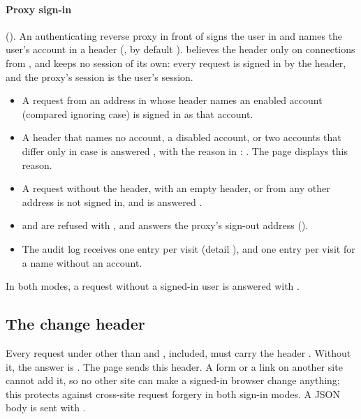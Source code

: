 \paragraph{Proxy sign-in} (). An authenticating reverse proxy in front
of \md{} signs the user in and names the user's account in a header (,
by default ). \md{} believes the header only on connections from
, and keeps no session of its own: every request is signed in by the
header, and the proxy's session is the user's session.
\begin{itemize}
\item A request from an address in  whose header names an enabled account
  (compared ignoring case) is signed in as that account.
\item A header that names no account, a disabled account, or two accounts that differ only in
  case is answered , with the reason in : . The page
  displays this reason.
\item A request without the header, with an empty header, or from any other address is not signed
  in, and is answered .
\item {} and  are refused with , and
   answers the proxy's sign-out address ().
\item The audit log receives one  entry per visit (detail ), and one
   entry per visit for a name without an account.
\end{itemize}

In both modes, a request without a signed-in user is answered  with
.

\subsection{The change header}
\label{sec:http-api-header}

Every request under  other than  and , 
included, must carry the header . Without it, the answer is 
. The page sends this header. A form or a link on
another site cannot add it, so no other site can make a signed-in browser change anything; this
protects against cross-site request forgery in both sign-in modes. A JSON body is sent with
.

